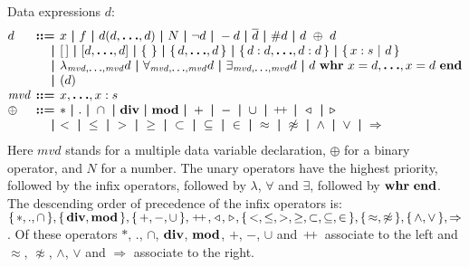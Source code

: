 \documentclass[a4paper,fleqn,10pt]{article}
\makeatletter
\newcommand{\f}[1]{\ensuremath{\mathit{#1}}}
\newenvironment{tightarray}[1]
  {\setlength{\arraycolsep}{2pt}%
   \begin{array}{@{}#1@{}}%
  }
  {\end{array}%
  }
\newcommand{\set}[1]{\ensuremath{\{\,#1\,\}}}
\newcommand{\scompr}[2]{\ensuremath{\set{#1\ |\ #2}}}
\newcommand{\el}{\ensuremath{[\,]}}
\newcommand{\cons}{\ensuremath{\hspace{0.12em}\triangleright\hspace{0.08em}}}
\newcommand{\snoc}{\ensuremath{\hspace{0.08em}\triangleleft\hspace{0.12em}}}
\newcommand{\concat}{\ensuremath{\hspace{0.12em}\raisebox{0.2ex}
{\text{\footnotesize+}\!\text{\footnotesize+}}\hspace{0.12em}}}
\newcommand{\limp}{\ensuremath{\Rightarrow}}
\newcommand{\mb}[1]{\text{\boldmath$#1$}}
\newcommand{\kwwhr}{{\bf whr}}
\newcommand{\kwend}{{\bf end}}
\newcommand{\kwdiv}{{\bf div}}
\newcommand{\kwmod}{{\bf mod}}
\makeatother
\begin{document}
Data expressions $d$:
\[\begin{tightarray}{lrl}
d      & \mb{::=} & x\ \mb{|}\ f\ \mb{|}\ d(d, \mb{\ldots}, d)\ \mb{|}\ N\ \mb{|}\ 
               \lnot d\ \mb{|}\ -d\ \mb{|}\ \overline{d}\ \mb{|}\ \#d\ \mb{|}\ d\ \oplus\ d\\
       & \mb{|} & \el\ \mb{|}\ [d,\mb{\ldots},d]\ \mb{|}\ \set{}\ \mb{|}\ \set{d,\mb{\ldots},d}\ \mb{|}\ 
               \set{d: d,\mb{\ldots},d: d}\ \mb{|}\ \scompr{x: s}{d}\\
       & \mb{|} & \lambda_{\f{mvd},\mb{\ldots},\f{mvd}} d\ \mb{|}\ 
               \forall_{\f{mvd},\mb{\ldots},\f{mvd}} d\ \mb{|}\ \exists_{\f{mvd},\mb{\ldots},\f{mvd}} d\ \mb{|}\ 
               d\ \kwwhr\ x=d,\mb{\ldots},x=d\ \kwend\\
        & \mb{|} & ( d )\\
\f{mvd}& \mb{::=} & x,\mb{\ldots},x: s\\
\oplus & \mb{::=} & *\ \mb{|}\ .\ \mb{|}\ \cap\ \mb{|}\ 
               \kwdiv\ \mb{|}\ \kwmod\ \mb{|}\ 
               +\ \mb{|}\ -\ \mb{|}\ \cup\ \mb{|}\ 
               \concat\ \mb{|}\ 
               \snoc\ \mb{|}\ 
               \cons\\
       & \mb{|} &
               <\ \mb{|}\ \leq\ \mb{|}\ >\ \mb{|}\ \geq\ \mb{|}\ \subset\ \mb{|}\ \subseteq\ \mb{|}\ \in\ \mb{|}\ 
               \approx\ \mb{|}\ \not\approx\ \mb{|}\ 
               \land\ \mb{|}\ \lor\ \mb{|}\ 
               \limp
\end{tightarray}\]
Here $\f{mvd}$ stands for a multiple data variable declaration, $\oplus$ for a binary operator, and $N$ for a number.
The unary operators have the highest priority, followed by the infix operators,
followed by $\lambda$, $\forall$ and $\exists$, followed by $\kwwhr\ \kwend$.
The descending order of precedence of the infix operators is:
$\set{*, ., \cap}, \set{\kwdiv, \kwmod}, \set{+, -, \cup}, \concat, \snoc,
\cons, \set{<, \leq, >, \geq, \subset, \subseteq, \in}, \set{\approx,\not\approx},
\set{\land, \lor}, \limp$.
Of these operators $*$, $.$, $\cap$, $\kwdiv$, $\kwmod$, $+$, $-$, $\cup$ and
$\concat$ associate to the left and $\approx$, $\not\approx$, $\land$, $\lor$
and $\limp$ associate to the right.
\end{document}
